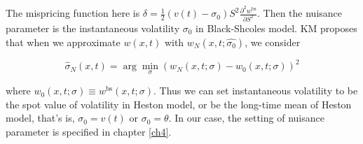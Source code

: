 \noindent The mispricing function here is $\delta = \frac{1}{2}(v(t)-\sigma_0)S^2 \frac{\partial^2 w^{\text{bs}}}{\partial S^2}. $ Then the nuisance parameter is the instantaneous volatility $\sigma_0$ in Black-Shcoles model. KM proposes that when we approximate $w(x,t)$ with $w_N(x,t;\hat{\sigma_0})$, we consider

$$
\hat{\sigma}_{N}(x, t)=\arg \min _{\sigma}\left(w_{N}(x, t ; \sigma)-w_{0}(x, t ; \sigma)\right)^{2}
$$

\noindent where $w_{0}(x, t ; \sigma)\equiv w^{\text{bs}}(x, t ; \sigma)$. Thus we can set instantaneous volatility to be the spot value of volatility in Heston model, or be the long-time mean of Heston model, that's is, $\sigma_0 = v(t)$ or $\sigma_0 = \theta$. In our case, the setting of nuisance parameter is specified in chapter \ref{ch4}.